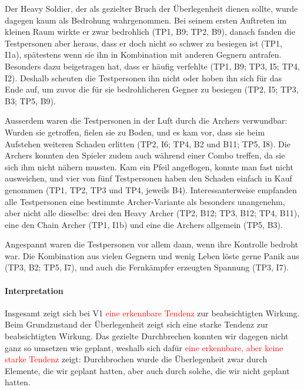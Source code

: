 \documentclass[../Main.tex]{subfiles}
\begin{document}
Der Heavy Soldier, der als gezielter Bruch der Überlegenheit dienen sollte, wurde dagegen kaum als Bedrohung wahrgenommen. Bei seinem ersten Auftreten im kleinen Raum wirkte er zwar bedrohlich (TP1, B9; TP2, B9), danach fanden die Testpersonen aber heraus, dass er doch nicht so schwer zu besiegen ist (TP1, I1a), spätestens wenn sie ihn in Kombination mit anderen Gegnern antrafen. Besonders dazu beigetragen hat, dass er häufig verfehlte (TP1, B9; TP3, I5; TP4, I2). Deshalb scheuten die Testpersonen ihn nicht oder hoben ihn sich für das Ende auf, um zuvor die für sie bedrohlicheren Gegner zu besiegen (TP2, I5; TP3, B3; TP5, B9).

Ausserdem waren die Testpersonen in der Luft durch die Archers verwundbar: Wurden sie getroffen, fielen sie zu Boden, und es kam vor, dass sie beim Aufstehen weiteren Schaden erlitten (TP2, I6; TP4, B2 und B11; TP5, I8). Die Archers konnten den Spieler zudem auch während einer Combo treffen, da sie sich ihm nicht nähern mussten. Kam ein Pfeil angeflogen, konnte man fast nicht ausweichen, und vier von fünf Testpersonen haben den Schaden einfach in Kauf genommen (TP1, TP2, TP3 und TP4, jeweils B4). Interessanterweise empfanden alle Testpersonen eine bestimmte Archer-Variante als besonders unangenehm, aber nicht alle dieselbe: drei den Heavy Archer (TP2, B12; TP3, B12; TP4, B11), eine den Chain Archer (TP1, I1b) und eine die Archers allgemein (TP5, B3).

Angespannt waren die Testpersonen vor allem dann, wenn ihre Kontrolle bedroht war. Die Kombination aus vielen Gegnern und wenig Leben löste gerne Panik aus (TP3, B2; TP5, I7), und auch die Fernkämpfer erzeugten Spannung (TP3, I7).

\paragraph{Interpretation}
Insgesamt zeigt sich bei V1 \textcolor{red}{eine erkennbare Tendenz} zur beabsichtigten Wirkung. Beim Grundzustand der Überlegenheit zeigt sich eine starke Tendenz zur beabsichtigten Wirkung. Das gezielte Durchbrechen konnten wir dagegen nicht ganz so umsetzen wie geplant, weshalb sich dafür \textcolor{red}{eine erkennbare, aber keine starke Tendenz} zeigt: Durchbrochen wurde die Überlegenheit zwar durch Elemente, die wir geplant hatten, aber auch durch solche, die wir nicht geplant hatten.
\end{document}
